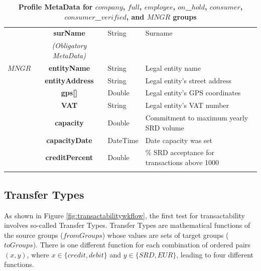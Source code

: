 \begin{table}[H]
\begin{centering}
{\begin{tabular}{ r | c | l | l }
			& {\bf surName}			&String	& Surname \\
\Xhline{1.5pt}
			& \emph{(Obligatory MetaData)} & & \\
\cline{2-2}
$MNGR$ 		& {\bf entityName}			&String	& Legal entity name \\
			& {\bf entityAddress}			&String	& Legal entity's street address \\
			& {\bf gps[]}				&Double	& Legal entity's GPS coordinates \\
			& {\bf VAT}				&String	& Legal entity's VAT number \\
			& {\bf capacity}				&Double	& Commitment to maximum yearly SRD volume \\
			& {\bf capacityDate}			&DateTime & Date capacity was set \\
			& {\bf creditPercent}			&Double	& \% SRD acceptance for transactions above 1000 \\
\Xhline{1.5pt}
\end{tabular}
}
\caption{\small\textbf{Profile MetaData for $company$, $full$, $employee$, $on$\_$hold$, $consumer$, $consumer$\_$verified$, and $MNGR$ groups}}
\label{tab:ProfileMetaData2}
\end{centering}
\end{table}

\subsection{Transfer Types}
As shown in Figure \ref{fig:transactabilitywkflow}, the first test for transactability involves so-called Transfer Types. Transfer Types are mathematical functions of the source groups ($fromGroups$) whose values are sets of target groups ($toGroups$). There is one different function for each combination of ordered pairs $(x, y)$, where $x \in \{ credit, debit \}$ and $y \in \{ SRD, EUR \}$, leading to four different functions.

